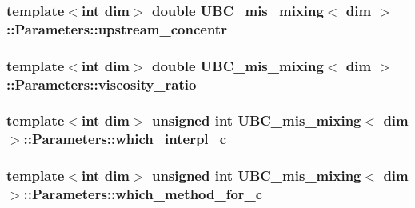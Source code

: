 \subsubsection[{upstream\+\_\+concentr}]{\setlength{\rightskip}{0pt plus 5cm}template$<$int dim$>$ double {\bf U\+B\+C\+\_\+mis\+\_\+mixing}$<$ dim $>$\+::Parameters\+::upstream\+\_\+concentr}\label{struct_u_b_c__mis__mixing_1_1_parameters_a70038d4135c91df2f4e5bc264436c537}
\hypertarget{struct_u_b_c__mis__mixing_1_1_parameters_a5247eabbe538c57069f6deefa55ac4d0}{}
\subsubsection[{viscosity\+\_\+ratio}]{\setlength{\rightskip}{0pt plus 5cm}template$<$int dim$>$ double {\bf U\+B\+C\+\_\+mis\+\_\+mixing}$<$ dim $>$\+::Parameters\+::viscosity\+\_\+ratio}\label{struct_u_b_c__mis__mixing_1_1_parameters_a5247eabbe538c57069f6deefa55ac4d0}
\hypertarget{struct_u_b_c__mis__mixing_1_1_parameters_a01aafac2f16cff86d97c56971b556863}{}
\subsubsection[{which\+\_\+interpl\+\_\+c}]{\setlength{\rightskip}{0pt plus 5cm}template$<$int dim$>$ unsigned int {\bf U\+B\+C\+\_\+mis\+\_\+mixing}$<$ dim $>$\+::Parameters\+::which\+\_\+interpl\+\_\+c}\label{struct_u_b_c__mis__mixing_1_1_parameters_a01aafac2f16cff86d97c56971b556863}
\hypertarget{struct_u_b_c__mis__mixing_1_1_parameters_a81d4347712206d82a814748c69c2403a}{}
\subsubsection[{which\+\_\+method\+\_\+for\+\_\+c}]{\setlength{\rightskip}{0pt plus 5cm}template$<$int dim$>$ unsigned int {\bf U\+B\+C\+\_\+mis\+\_\+mixing}$<$ dim $>$\+::Parameters\+::which\+\_\+method\+\_\+for\+\_\+c}\label{struct_u_b_c__mis__mixing_1_1_parameters_a81d4347712206d82a814748c69c2403a}


